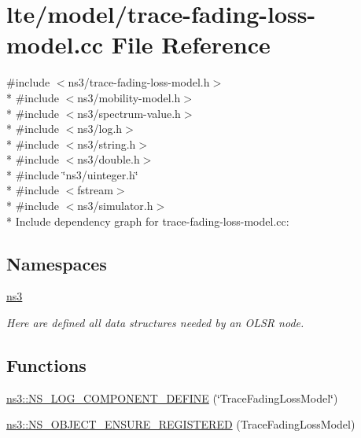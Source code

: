 \hypertarget{lte_2model_2trace-fading-loss-model_8cc}{}\section{lte/model/trace-\/fading-\/loss-\/model.cc File Reference}
\label{lte_2model_2trace-fading-loss-model_8cc}
{\ttfamily \#include $<$ns3/trace-\/fading-\/loss-\/model.\+h$>$}\\*
{\ttfamily \#include $<$ns3/mobility-\/model.\+h$>$}\\*
{\ttfamily \#include $<$ns3/spectrum-\/value.\+h$>$}\\*
{\ttfamily \#include $<$ns3/log.\+h$>$}\\*
{\ttfamily \#include $<$ns3/string.\+h$>$}\\*
{\ttfamily \#include $<$ns3/double.\+h$>$}\\*
{\ttfamily \#include \char`\"{}ns3/uinteger.\+h\char`\"{}}\\*
{\ttfamily \#include $<$fstream$>$}\\*
{\ttfamily \#include $<$ns3/simulator.\+h$>$}\\*
Include dependency graph for trace-\/fading-\/loss-\/model.cc\+:
\subsection*{Namespaces}
\begin{DoxyCompactItemize}
\item 
 \hyperlink{namespacens3}{ns3}
\begin{DoxyCompactList}\small\item\em Here are defined all data structures needed by an O\+L\+SR node. \end{DoxyCompactList}\end{DoxyCompactItemize}
\subsection*{Functions}
\begin{DoxyCompactItemize}
\item 
\hyperlink{namespacens3_a9aadb4926abd18448d1f813138530fec}{ns3\+::\+N\+S\+\_\+\+L\+O\+G\+\_\+\+C\+O\+M\+P\+O\+N\+E\+N\+T\+\_\+\+D\+E\+F\+I\+NE} (\char`\"{}Trace\+Fading\+Loss\+Model\char`\"{})
\item 
\hyperlink{namespacens3_aacec7655e3215ff2c90f9ecce704d9a7}{ns3\+::\+N\+S\+\_\+\+O\+B\+J\+E\+C\+T\+\_\+\+E\+N\+S\+U\+R\+E\+\_\+\+R\+E\+G\+I\+S\+T\+E\+R\+ED} (Trace\+Fading\+Loss\+Model)
\end{DoxyCompactItemize}
